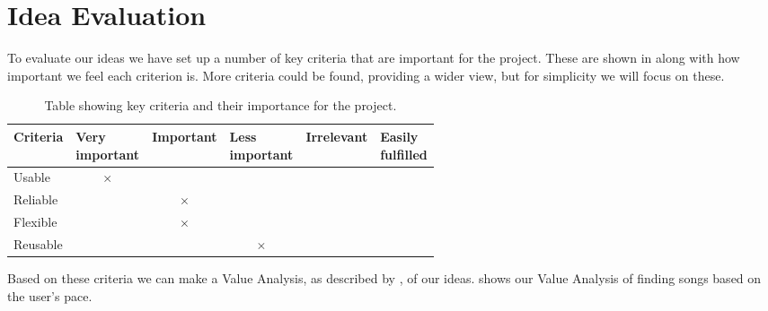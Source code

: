 \section{Idea Evaluation}
%
To evaluate our ideas we have set up a number of key criteria that are important for the project. These are shown in  along with how important we feel each criterion is. More criteria could be found, providing a wider view, but for simplicity we will focus on these.


\begin{table}[h]\label{tab:criteria}
\begin{tabular}{|l|l|l|l|l|l|}
\hline
{\textbf {Criteria}} & \parbox{0.15\textwidth}{\textbf {Very \\ important}} & \parbox{0.15\textwidth}{\textbf {Important}} & \parbox{0.15\textwidth}{\textbf {Less\\important}} & \parbox{0.15\textwidth}{\textbf {Irrelevant}} & \parbox{0.15\textwidth}{\textbf {Easily\\fulfilled}} \\ \hline
Usable         &  &                               &                               &                  &                        \\ \hline
Reliable       &                               &  &                               &                  &                        \\ \hline
Flexible       &                               &  &                               &                  &                        \\ \hline
Reusable       &                               &                               &  &                  &                        \\ \hline
\end{tabular}
\caption{Table showing key criteria and their importance for the project.}
\end{table}
Based on these criteria we can make a Value Analysis, as described by \citet[ pp. 118-120]{essence}, of our ideas.  shows our Value Analysis of finding songs based on the user's pace.


